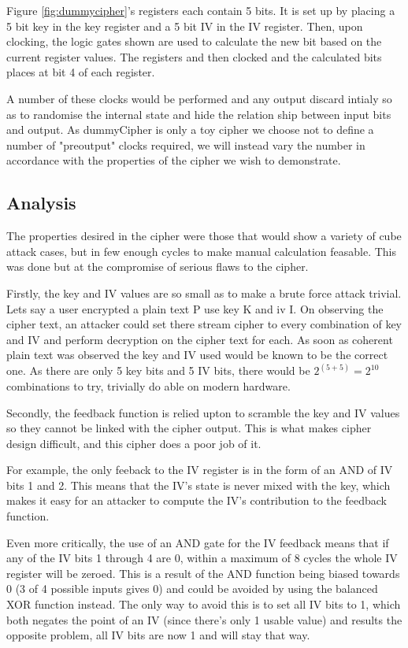\documentclass{report}
\begin{document}
Figure \ref{fig:dummycipher}'s registers each contain 5 bits. It is set up by placing a 5 bit key in the key register and a 5 bit IV in the IV register. Then, upon clocking, the logic gates shown are used to calculate the new bit based on the current register values. The registers and then clocked and the calculated bits places at bit 4 of each register.

A number of these clocks would be performed and any output discard intialy so as to randomise the internal state and hide the relation ship between input bits and output. As dummyCipher is only a toy cipher we choose not to define a number of "preoutput" clocks required, we will instead vary the number in accordance with the properties of the cipher we wish to demonstrate.

\subsection{Analysis}

The properties desired in the cipher were those that would show a variety of cube attack cases, but in few enough cycles to make manual calculation feasable. This was done but at the compromise of serious flaws to the cipher.

Firstly, the key and IV values are so small as to make a brute force attack trivial. Lets say a user encrypted a plain text P use key K and iv I. On observing the cipher text, an attacker could set there stream cipher to every combination of key and IV and perform decryption on the cipher text for each. As soon as coherent plain text was observed the key and IV used would be known to be the correct one. As there are only 5 key bits and 5 IV bits, there would be $2^(5+5) = 2^10$ combinations to try, trivially do able on modern hardware.

Secondly, the feedback function is relied upton to scramble the key and IV values so they cannot be linked with the cipher output. This is what makes cipher design difficult, and this cipher does a poor job of it.

For example, the only feeback to the IV register is in the form of an AND of IV bits 1 and 2. This means that the IV's state is never mixed with the key, which makes it easy for an attacker to compute the IV's contribution to the feedback function.

Even more critically, the use of an AND gate for the IV feedback means that if any  of the IV bits 1 through 4 are 0, within a maximum of 8 cycles the whole IV register will be zeroed. This is a result of the AND function being biased towards 0 (3 of 4 possible inputs gives 0) and could be avoided by using the balanced XOR function instead. The only way to avoid this is to set all IV bits to 1, which both negates the point of an IV (since there's only 1 usable value) and results the opposite problem, all IV bits are now 1 and will stay that way.
\end{document}
